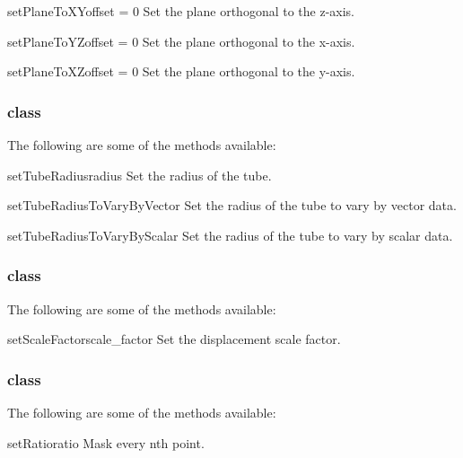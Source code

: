 \begin{methoddesc}[Transform]{setPlaneToXY}{offset = 0}
Set the plane orthogonal to the z-axis.
\end{methoddesc}

\begin{methoddesc}[Transform]{setPlaneToYZ}{offset = 0}
Set the plane orthogonal to the x-axis.
\end{methoddesc}

\begin{methoddesc}[Transform]{setPlaneToXZ}{offset = 0}
Set the plane orthogonal to the y-axis.
\end{methoddesc}

\subsubsection{\Tube class}

The following are some of the methods available:

\begin{methoddesc}[Tube]{setTubeRadius}{radius}
Set the radius of the tube.
\end{methoddesc}

\begin{methoddesc}[Tube]{setTubeRadiusToVaryByVector}{}
Set the radius of the tube to vary by vector data.
\end{methoddesc}

\begin{methoddesc}[Tube]{setTubeRadiusToVaryByScalar}{}
Set the radius of the tube to vary by scalar data.
\end{methoddesc}

\subsubsection{\Warp class}

The following are some of the methods available:

\begin{methoddesc}[Warp]{setScaleFactor}{scale_factor}
Set the displacement scale factor.
\end{methoddesc}

\subsubsection{\MaskPoints class}

The following are some of the methods available:

\begin{methoddesc}[MaskPoints]{setRatio}{ratio}
Mask every nth point.
\end{methoddesc}

